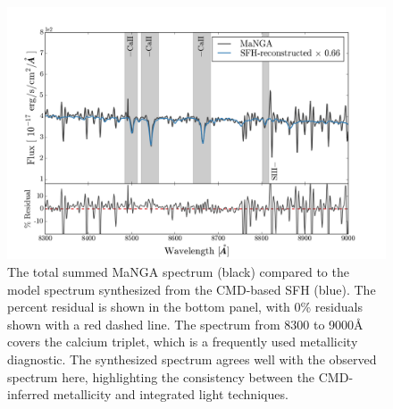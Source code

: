 \documentclass[preprint2]{aastex62}
\newcommand{\ang}{\ensuremath{\mbox{\AA}}\xspace}
\begin{document}
\begin{figure}
  \begin{center}
    \includegraphics[width=\linewidth]{figs/figC.png}
    \caption{The total summed MaNGA spectrum (black) compared to the model spectrum synthesized from the CMD-based SFH (blue). The percent residual is shown in the bottom panel, with 0\% residuals shown with a red dashed line. The spectrum from 8300 to 9000\ang covers the calcium triplet, which is a frequently used metallicity diagnostic. The synthesized spectrum agrees well with the observed spectrum here, highlighting the consistency between the CMD-inferred metallicity and integrated light techniques.}
    \label{fig:zoomSpec2}
  \end{center}
\end{figure}
\end{document}
